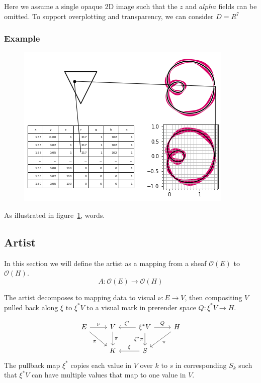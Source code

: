 \documentclass[../main.tex]{subfiles}
\begin{document}
Here we assume a single opaque 2D image such that the $z$ and $alpha$ fields can be omitted. To support overplotting and transparency, we can consider $D=R^{7}$

\subsubsection{{Example}}
\begin{figure}[ht!]
    \includegraphics[width=.4\linewidth]{figures/math/render.png}
    \caption{}
    \label{fig:render}
\end{figure}

As illustrated in figure~\ref{fig:render}, words.

\subsection{Artist}
\label{sec:artist}

In this section we will define the artist as a mapping from a sheaf $\mathcal{O}(E)$  to $\mathcal{O}(H)$. 
\begin{equation}
    A: \mathcal{O}(E) \rightarrow \mathcal{O}(H)
\end{equation}

The artist decomposes to mapping data to visual $\nu:E\rightarrow V$, then  compositing $V$ pulled back along $\xi$ to $\xi^*V$ to a visual mark in prerender space $Q:\xi^*V\rightarrow H$. 

\begin{equation}
    \label{eq:artist_diagram}
    \begin{tikzcd}
        E \arrow[r, "\nu"] \arrow[rd, "\pi"'] & V \arrow[d, "\pi"] & \xi^*V \arrow[r, "Q"] \arrow[d, "\xi^*\pi"'] \arrow[l, "\xi^*"'] & H \arrow[ld, "\pi"] \\
                                              & K                  & S \arrow[l, "\xi"']                                              &                    
        \end{tikzcd}
\end{equation}
The pullback map $\xi^*$ copies each value in $V$ over $k$ to $s$ in corresponding $S_k$ such that $\xi^*V$ can have multiple values that map to one value in $V$. 
\end{document}
